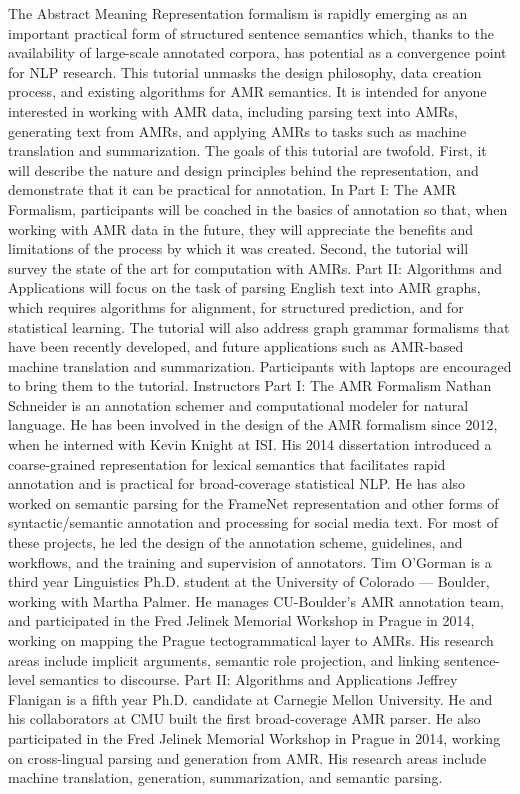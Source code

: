 The Abstract Meaning Representation formalism is rapidly emerging as an important practical form of structured sentence semantics which, thanks to the availability of large-scale annotated corpora, has potential as a convergence point for NLP research. This tutorial unmasks the design philosophy, data creation process, and existing algorithms for AMR semantics. It is intended for anyone interested in working with AMR data, including parsing text into AMRs, generating text from AMRs, and applying AMRs to tasks such as machine translation and summarization. The goals of this tutorial are twofold. First, it will describe the nature and design principles behind the representation, and demonstrate that it can be practical for annotation. In Part I: The AMR Formalism, participants will be coached in the basics of annotation so that, when working with AMR data in the future, they will appreciate the benefits and limitations of the process by which it was created. Second, the tutorial will survey the state of the art for computation with AMRs. Part II: Algorithms and Applications will focus on the task of parsing English text into AMR graphs, which requires algorithms for alignment, for structured prediction, and for statistical learning. The tutorial will also address graph grammar formalisms that have been recently developed, and future applications such as AMR-based machine translation and summarization. Participants with laptops are encouraged to bring them to the tutorial. Instructors Part I: The AMR Formalism Nathan Schneider is an annotation schemer and computational modeler for natural language. He has been involved in the design of the AMR formalism since 2012, when he interned with Kevin Knight at ISI. His 2014 dissertation introduced a coarse-grained representation for lexical semantics that facilitates rapid annotation and is practical for broad-coverage statistical NLP. He has also worked on semantic parsing for the FrameNet representation and other forms of syntactic/semantic annotation and processing for social media text. For most of these projects, he led the design of the annotation scheme, guidelines, and workflows, and the training and supervision of annotators. Tim O'Gorman is a third year Linguistics Ph.D. student at the University of Colorado --- Boulder, working with Martha Palmer. He manages CU-Boulder's AMR annotation team, and participated in the Fred Jelinek Memorial Workshop in Prague in 2014, working on mapping the Prague tectogrammatical layer to AMRs. His research areas include implicit arguments, semantic role projection, and linking sentence-level semantics to discourse. Part II: Algorithms and Applications Jeffrey Flanigan is a fifth year Ph.D. candidate at Carnegie Mellon University. He and his collaborators at CMU built the first broad-coverage AMR parser. He also participated in the Fred Jelinek Memorial Workshop in Prague in 2014, working on cross-lingual parsing and generation from AMR. His research areas include machine translation, generation, summarization, and semantic parsing.
